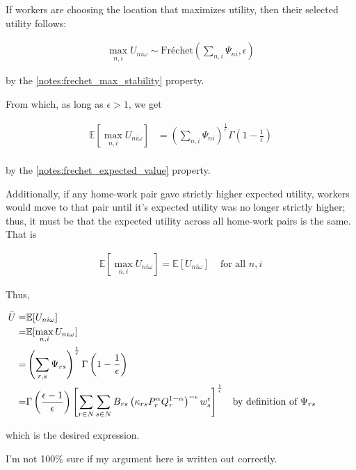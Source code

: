\documentclass[10pt]{article}
\begin{document}
If workers are choosing the location that maximizes utility, 
then their selected utility follows:

\begin{align}
    \max_{n, i} U_{n i \omega} \sim \text{Fréchet}\left(\sum_{n, i} \Psi_{n i}, \epsilon\right)
\end{align}

by the \autoref{notes:frechet_max_stability} property.

From which, as long as $\epsilon > 1$, we get

\begin{align}
    \mathbb{E}[ \max_{n, i} U_{n i \omega}] &= \left(\sum_{n, i} \Psi_{n i}\right)^{\frac{1}{\epsilon}} \Gamma\left(1-\frac{1}{\epsilon}\right) \\
\end{align}

by the \autoref{notes:frechet_expected_value} property.

Additionally, if any home-work pair gave strictly higher 
expected utility, workers would move to that pair until 
it's expected utility was no longer strictly higher; thus, 
it must be that the expected utility across 
all home-work pairs is the same. 
That is

\begin{align}
    \mathbb{E}[ \max_{n, i} U_{n i \omega}] = \mathbb{E}[U_{ni \omega}] & \text{ for all } n, i
\end{align}

Thus, 

\begin{align}
    \bar{U} = &\mathbb{E}[U_{n i \omega}]  \\ 
    = & \mathbb{E}[ \max_{n, i} U_{n i \omega}] \\
    = &\left(\sum_{r, s} \Psi_{r s}\right)^{\frac{1}{\epsilon}} \Gamma\left(1-\frac{1}{\epsilon}\right) \\
    = &\Gamma\left(\frac{\epsilon-1}{\epsilon}\right)\left[\sum_{r \in N} \sum_{s \in N} B_{r s}\left(\kappa_{r s} P_r^\alpha Q_r^{1-\alpha}\right)^{-\epsilon} w_s^\epsilon\right]^{\frac{1}{\epsilon}} && \parbox[t]{4cm}{\raggedright by definition of $\Psi_{rs}$} \\
\end{align}

which is the desired expression.

\begin{questions}[Uncertainty]
    I'm not 100\% sure if my argument here is written out correctly.
\end{questions}
\end{document}
